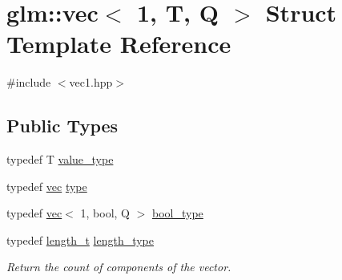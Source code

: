 \hypertarget{structglm_1_1vec_3_011_00_01_t_00_01_q_01_4}{}\section{glm\+:\+:vec$<$ 1, T, Q $>$ Struct Template Reference}
\label{structglm_1_1vec_3_011_00_01_t_00_01_q_01_4}


{\ttfamily \#include $<$vec1.\+hpp$>$}

\subsection*{Public Types}
\begin{DoxyCompactItemize}
\item 
typedef T \hyperlink{structglm_1_1vec_3_011_00_01_t_00_01_q_01_4_a0d473625a844d6df09585a2a2eed637c}{value\+\_\+type}
\item 
typedef \hyperlink{structglm_1_1vec}{vec} \hyperlink{structglm_1_1vec_3_011_00_01_t_00_01_q_01_4_acc52e9f1fce6c99322df114842a855dd}{type}
\item 
typedef \hyperlink{structglm_1_1vec}{vec}$<$ 1, bool, Q $>$ \hyperlink{structglm_1_1vec_3_011_00_01_t_00_01_q_01_4_abf395a27aa73d1032bd2810013358668}{bool\+\_\+type}
\item 
typedef \hyperlink{namespaceglm_a090a0de2260835bee80e71a702492ed9}{length\+\_\+t} \hyperlink{structglm_1_1vec_3_011_00_01_t_00_01_q_01_4_a37415eee3b59cf93cdb752a2b30fe5e6}{length\+\_\+type}
\begin{DoxyCompactList}\small\item\em Return the count of components of the vector. \end{DoxyCompactList}\end{DoxyCompactItemize}
